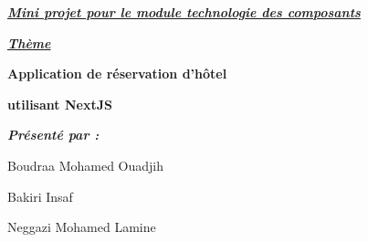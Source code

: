 \documentclass[12pt]{report}
\begin{document}
\begin{titlepage}
    \begin{center}
        \begin{large}

            \vspace{0.1in}

            \textit{\textbf{\uline{Mini projet pour le module technologie des composants}}}
        
        \end{large}

        \vspace{0.3in}

        \textit{\Huge{\textbf{\uline{Thème}}}}

        \vspace{0.2in}

        \begin{mdframed}[style=MyFrame]
            \begin{center}
            \color{BlueViolet}
              \LARGE{\textbf{Application de réservation d'hôtel}}

              \LARGE{\textbf{utilisant NextJS}}
            \end{center}
        \end{mdframed}
    \end{center}

    \vspace{0.4in}

    \hspace{0.2in}
    \textit{\textbf{Présenté par :}}

    \hspace{0.2in}
    Boudraa Mohamed Ouadjih

    \hspace{0.2in}
    Bakiri Insaf

    \hspace{0.2in}
    Neggazi Mohamed Lamine

\end{titlepage}

\newpage

\vspace*{0.2in}

\thispagestyle{empty}
\end{document}
